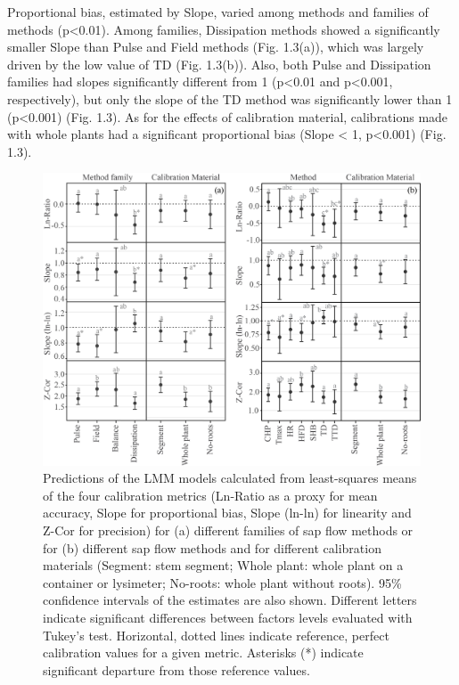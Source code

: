 \documentclass[11pt,twoside]{reedthesis}
\begin{document}
Proportional bias, estimated by Slope, varied among methods and families
of methods (p\textless{}0.01). Among families, Dissipation methods
showed a significantly smaller Slope than Pulse and Field methods (Fig.
1.3(a)), which was largely driven by the low value of TD (Fig. 1.3(b)).
Also, both Pulse and Dissipation families had slopes significantly
different from 1 (p\textless{}0.01 and p\textless{}0.001, respectively),
but only the slope of the TD method was significantly lower than 1
(p\textless{}0.001) (Fig. 1.3). As for the effects of calibration
material, calibrations made with whole plants had a significant
proportional bias (Slope \textless{} 1, p\textless{}0.001) (Fig. 1.3).
\begin{figure}[p]

{\centering \includegraphics[width=1\linewidth]{figure/CH2/FAMILYMETHODS} 

}

\caption{Predictions of the LMM models calculated from least-squares means of the four calibration metrics (Ln-Ratio as a proxy for mean accuracy, Slope for proportional bias, Slope (ln-ln) for linearity and Z-Cor for precision) for (a) different families of sap flow methods or for (b) different sap flow methods and for different calibration materials (Segment: stem segment; Whole plant: whole plant on a container or lysimeter; No-roots: whole plant without roots). 95\% confidence intervals of the estimates are also shown. Different letters indicate significant differences between factors levels evaluated with Tukey's test. Horizontal, dotted lines indicate reference, perfect calibration values for a given metric. Asterisks (*) indicate significant departure from those reference values.}\label{fig:ch1fig3}
\end{figure}
\end{document}
